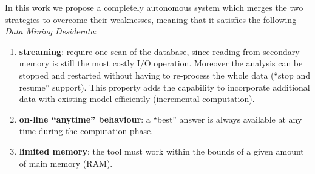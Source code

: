 In this work we propose a completely autonomous system which merges the two strategies to overcome their weaknesses, meaning that it satisfies the following \emph{Data Mining Desiderata}:
\begin{enumerate}
    \item \textbf{streaming}: require one scan of the database, since reading from secondary memory is still the most costly I/O operation.
    Moreover the analysis can be stopped and restarted without having to re-process the whole data (``stop and resume'' support).
    This property adds the capability to incorporate additional data with existing model efficiently (incremental computation).
    \item \textbf{on-line ``anytime'' behaviour}: a ``best'' answer is always available at any time during the computation phase.
    \item \textbf{limited memory}: the tool must work within the bounds of a given amount of main memory (RAM).
\end{enumerate}

